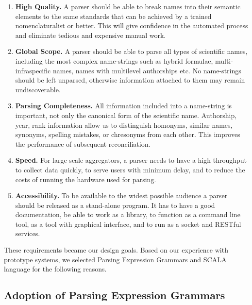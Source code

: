 \documentclass{bmcart}
\begin{document}
\begin{enumerate}

  \item \textbf{High Quality.} A parser should be able to break names into their
    semantic elements to the same standards that can be achieved by a trained
    nomenclaturalist or better. This will give confidence in the automated process and eliminate tedious
    and expensive manual work.

  \item \textbf{Global Scope.} A parser should be able to parse all types of
    scientific names, including the most complex name-strings such as hybrid
    formulae, multi-infraspecific names, names with multilevel authorships etc.
    No name-strings should be left unparsed, otherwise information attached to
    them may remain undiscoverable.

  \item \textbf{Parsing Completeness.} All information included into a
    name-string is important, not only the canonical form of the scientific name. Authorship, year,
    rank information allow us to distinguish homonyms, similar names, synonyms,
    spelling mistakes, or chresonyms from each other.  This improves the performance of subsequent reconciliation.

  \item \textbf{Speed.} For large-scale aggregators, a parser needs to have a
    high throughput to collect data quickly, to serve users with minimum delay,
    and to reduce the costs of running the hardware used for parsing.

  \item \textbf{Accessibility.} To be available to the widest possible audience
    a parser should be released as a stand-alone program. It has to have a
    good documentation, be able to work as a library, to function as a command
    line tool, as a tool with graphical interface, and to run as a socket and
    RESTful services.

\end{enumerate}

These requirements became our design goals. Based on our experience with prototype systems, we selected Parsing Expression Grammars and SCALA language for the following reasons. 

\subsection*{Adoption of Parsing Expression Grammars}
\end{document}
